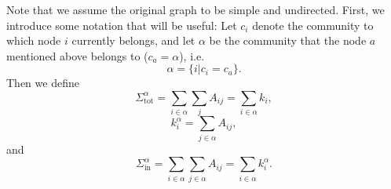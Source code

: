 \documentclass{article}
\begin{document}
Note that we assume the original graph to be simple and undirected.
First, we introduce some notation that will be useful:
Let $c_i$ denote the community to which node $i$ currently belongs, 
and let $\alpha$ be the community that the node $a$ mentioned above
belongs to ($c_a = \alpha$), i.e.
\begin{equation}
	\alpha = \{i | c_i = c_a\}.
\end{equation}
Then we define
\newcommand{\Stot}[1]{\Sigma_{\text{tot}}^{#1}}
\begin{equation}
	\Stot{\alpha} = \sum_{i \in \alpha}\sum_{j}A_{ij} = \sum_{i \in \alpha}k_i,
\end{equation}
\newcommand{\kin}[2]{k_{#1}^{#2}}
\begin{equation}
	\kin{i}{\alpha} = \sum_{j \in \alpha}A_{ij},
\end{equation}
and
\newcommand{\Sin}[1]{\Sigma_{\text{in}}^{#1}}
\begin{equation}
	\Sin{\alpha} = \sum_{i \in \alpha}\sum_{j \in \alpha}A_{ij} = \sum_{i \in \alpha}\kin{i}{\alpha}.
\end{equation}
\end{document}
